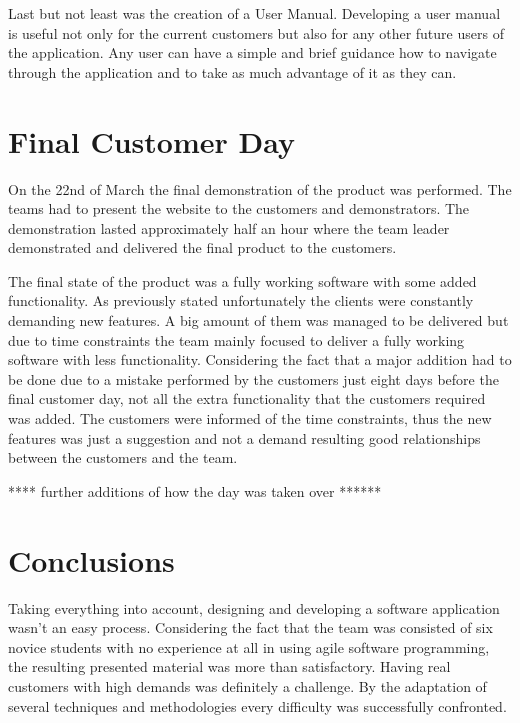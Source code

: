 \documentclass{l3proj}
\begin{document}
Last but not least was the creation of a User Manual. Developing a user manual is useful not only for the current customers but also for any other future users of the application. Any user can have a simple and brief guidance how to navigate through the application and to take as much advantage of it as they can.



\section{Final Customer Day}
\label{sec:finalDay}

On the 22nd of March the final demonstration of the product was performed. The teams had to present the website to the customers and demonstrators. The demonstration lasted approximately half an hour where the team leader demonstrated and delivered the final product to the customers.

The final state of the product was a fully working software with some added functionality. As previously stated unfortunately the clients were constantly demanding new features. A big amount of them was managed to be delivered but due to time constraints the team mainly focused to deliver a fully working software with less functionality. Considering the fact that a major addition had to be done due to a mistake performed by the customers just eight days before the final customer day, not all the extra functionality that the customers required was added. The customers were informed of the time constraints, thus the new features was just a suggestion and not a demand resulting good relationships between the customers and the team.



**** further additions of how the day was taken over ******



\section{Conclusions}

Taking everything into account, designing and developing a software application wasn't an easy process. Considering the fact that the team was consisted of six novice students with no experience at all in using agile software programming, the resulting presented material was more than satisfactory. Having real customers with high demands was definitely a challenge. By the adaptation of several techniques and methodologies every difficulty was successfully confronted.
\end{document}
